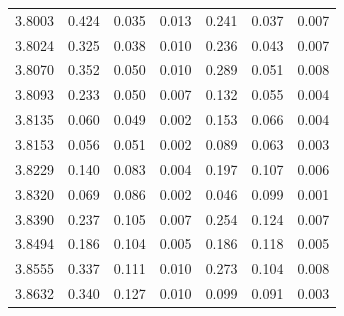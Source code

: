 \begin{table}[H]
\begin{tabular}{c|c@{$\; \pm \;$}c@{$\; \pm \;$}c c@{$\; \pm \;$}c@{$\; \pm \;$}c}
3.8003 & 0.424 & 0.035 & 0.013 & 0.241 & 0.037 & 0.007 \\
3.8024 & 0.325 & 0.038 & 0.010 & 0.236 & 0.043 & 0.007 \\
3.8070 & 0.352 & 0.050 & 0.010 & 0.289 & 0.051 & 0.008 \\
3.8093 & 0.233 & 0.050 & 0.007 & 0.132 & 0.055 & 0.004 \\
3.8135 & 0.060 & 0.049 & 0.002 & 0.153 & 0.066 & 0.004 \\
3.8153 & 0.056 & 0.051 & 0.002 & 0.089 & 0.063 & 0.003 \\
3.8229 & 0.140 & 0.083 & 0.004 & 0.197 & 0.107 & 0.006 \\
3.8320 & 0.069 & 0.086 & 0.002 & 0.046 & 0.099 & 0.001 \\
3.8390 & 0.237 & 0.105 & 0.007 & 0.254 & 0.124 & 0.007 \\
3.8494 & 0.186 & 0.104 & 0.005 & 0.186 & 0.118 & 0.005 \\
3.8555 & 0.337 & 0.111 & 0.010 & 0.273 & 0.104 & 0.008 \\
3.8632 & 0.340 & 0.127 & 0.010 & 0.099 & 0.091 & 0.003 \\

\end{tabular}
\end{table}

